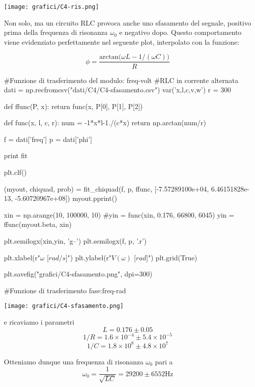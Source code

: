 \begin{center}
\texttt{[image: grafici/C4-ris.png]}
\end{center}

Non solo, ma un circuito RLC provoca anche uno sfasamento del segnale, positivo prima della frequenza di risonanza $\omega_0$ e negativo dopo.
Questo comportamento viene evidenziato perfettamente nel seguente plot, interpolato con la funzione:

$$\phi=\frac{\text{arctan}\Big(\omega L -1/(\omega C)\Big)}{R}$$


\begin{sagesilent}

#Funzione di trasferimento del modulo: freq-volt
#RLC in corrente alternata
dati = np.recfromcsv("dati/C4/C4-sfasamento.csv")
var('x,l,c,v,w')
r = 300

def ffunc(P, x):
    return func(x, P[0], P[1], P[2])

def func(x, l, c, r):
    num = -1*x*l-1./(c*x)
    return np.arctan(num/r)

f = dati['freq']
p = dati['phi']

print fit

plt.clf()

(myout, chiquad, prob) = fit_chiquad(f, p, ffunc, [-7.57289100e+04,   6.46151828e-13, -5.60720967e+08])
myout.pprint()

xin = np.arange(10, 100000, 10)
#yin = func(xin, 0.176, 66800, 6045)
yin = ffunc(myout.beta, xin)

plt.semilogx(xin,yin, 'g--')
plt.semilogx(f, p, '.r')

plt.xlabel(r"$\omega$ [$rad/s$]")
plt.ylabel(r"$V(\omega)$ [$rad$]")
plt.grid(True)

plt.savefig("grafici/C4-sfasamento.png", dpi=300)

#Funzione di trasferimento fase:freq-rad
  
\end{sagesilent}

\begin{center}
\texttt{[image: grafici/C4-sfasamento.png]}
\end{center}
e ricaviamo i parametri
$$L = 0.176\pm 0.05$$
$$1/R = 1.6\times 10^{-4} \pm 5.4\times 10^{-5}$$
$$1/C = 1.8\times 10^8\pm4.8\times 10^7$$

Otteniamo dunque una frequenza di risonanza $\omega_0$ pari a
$$\omega_0 = \frac{1}{\sqrt{LC}} = 29200 \pm 6552\text{Hz}$$
